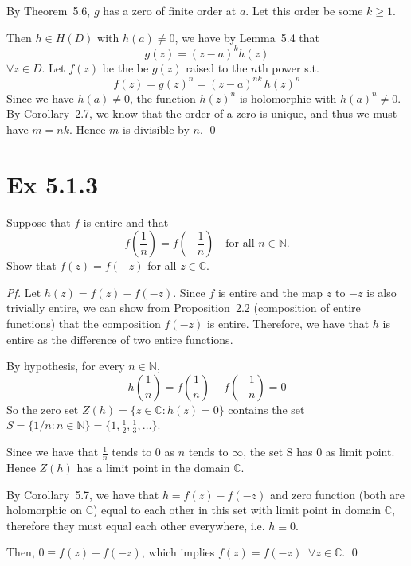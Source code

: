 \documentclass[a4paper]{article}
\begin{document}
\medskip
By Theorem~5.6, $g$ has a zero of finite order at $a$. Let this order be some $k\ge 1$.

Then $h\in H(D)$ with $h(a)\ne 0$, we have by Lemma~5.4 that 
\[
g(z)=(z-a)^k h(z)
\]
$\forall z \in D$. Let $f(z)$ be the be $g(z)$ raised to the $n$th power s.t.
\[
  f(z) = g(z)^n = (z-a)^{nk}\,h(z)^n
\]
Since we have $h(a)\ne 0$, the function $h(z)^n$ is holomorphic with $h(a)^n\ne 0$.
By Corollary~2.7, we know that the order of a zero is unique, and thus we must have $m=nk$.
Hence $m$ is divisible by $n$. \qed

\newpage
\section*{Ex 5.1.3}

\begin{tcolorbox}[colback=gray!10, colframe=black, boxrule=0.5pt, arc=2mm]
Suppose that $f$ is entire and that
\[
  f\!\left(\frac{1}{n}\right) = f\!\left(-\frac{1}{n}\right)
  \quad\text{for all } n\in\mathbb{N}.
\]
Show that $f(z)=f(-z)$ for all $z\in\mathbb{C}$.
\end{tcolorbox}

\textit{Pf.} Let $h(z)=f(z)-f(-z)$.
Since $f$ is entire and the map $z$ to $-z$ is also trivially entire, we can show from Proposition~2.2 (composition of entire functions) that the composition $f(-z)$ is entire. Therefore, we have that $h$ is entire as the difference of two entire functions.

\medskip
By hypothesis, for every $n\in\mathbb{N}$,
\[
  h\!\left(\frac{1}{n}\right) = f\!\left(\frac{1}{n}\right)-f\!\left(-\frac{1}{n}\right) = 0
\]
So the zero set $Z(h)=\{z\in\mathbb{C}:h(z)=0\}$ contains the set $S=\{1/n:n\in\mathbb{N}\}=\{1,\tfrac{1}{2},\tfrac{1}{3},\ldots\}$.

Since we have that $\displaystyle \frac{1}{n}$ tends to $0$ as $n$ tends to $\infty$, the set S has $0$ as limit point.
Hence $Z(h)$ has a limit point in the domain $\mathbb{C}$.

\medskip
By Corollary~5.7, we have that $h = f(z) - f(-z)$ and zero function (both are holomorphic on $\mathbb{C}$) equal to each other in this set with limit point in domain $\mathbb{C}$, therefore they must equal each other everywhere, i.e. $h \equiv 0$.

\medskip
Then, $0 \equiv f(z) - f(-z)$, which implies $f(z) = f(-z) \;\; \forall z\in\mathbb{C}$. \qed
\end{document}
